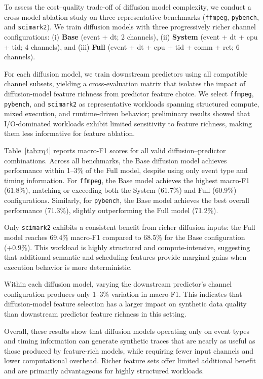 To assess the cost–quality trade-off of diffusion model complexity, we conduct a cross-model ablation study on three representative benchmarks (\texttt{ffmpeg}, \texttt{pybench}, and \texttt{scimark2}). We train diffusion models with three progressively richer channel configurations:
(i) \textbf{Base} (event + dt; 2 channels),
(ii) \textbf{System} (event + dt + cpu + tid; 4 channels), and
(iii) \textbf{Full} (event + dt + cpu + tid + comm + ret; 6 channels).

For each diffusion model, we train downstream predictors using all compatible channel subsets, yielding a cross-evaluation matrix that isolates the impact of diffusion-model feature richness from predictor feature choice.
We select \texttt{ffmpeg}, \texttt{pybench}, and \texttt{scimark2} as representative workloads spanning structured compute, mixed execution, and runtime-driven behavior; preliminary results showed that I/O-dominated workloads exhibit limited sensitivity to feature richness, making them less informative for feature ablation.

Table~\ref{tab:rq4} reports macro-F1 scores for all valid diffusion–predictor combinations. Across all benchmarks, the Base diffusion model achieves performance within 1--3\% of the Full model, despite using only event type and timing information. For \texttt{ffmpeg}, the Base model achieves the highest macro-F1 (61.8\%), matching or exceeding both the System (61.7\%) and Full (60.9\%) configurations. Similarly, for \texttt{pybench}, the Base model achieves the best overall performance (71.3\%), slightly outperforming the Full model (71.2\%).

Only \texttt{scimark2} exhibits a consistent benefit from richer diffusion inputs: the Full model reaches 69.4\% macro-F1 compared to 68.5\% for the Base configuration (+0.9\%). This workload is highly structured and compute-intensive, suggesting that additional semantic and scheduling features provide marginal gains when execution behavior is more deterministic.

Within each diffusion model, varying the downstream predictor’s channel configuration produces only 1--3\% variation in macro-F1. This indicates that diffusion-model feature selection has a larger impact on synthetic data quality than downstream predictor feature richness in this setting.

Overall, these results show that diffusion models operating only on event types and timing information can generate synthetic traces that are nearly as useful as those produced by feature-rich models, while requiring fewer input channels and lower computational overhead. Richer feature sets offer limited additional benefit and are primarily advantageous for highly structured workloads.

